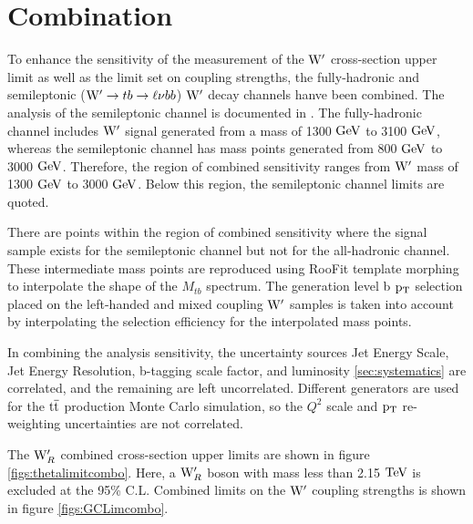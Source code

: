 \chapter{Combination}
\label{sec:combo}
To enhance the sensitivity of the measurement of the $\mathrm{W}^\prime$ cross-section upper limit as well as the limit set on coupling strengths, the fully-hadronic and 
semileptonic ($\mathrm{W}^\prime \to tb \to \ell\nu bb$) $\mathrm{W}^\prime$ decay channels hanve been combined.  
The analysis of the semileptonic channel is documented in \cite{Chatrchyan:2014koa}.  The fully-hadronic channel includes $\mathrm{W}^\prime$ signal generated from a 
mass of 1300 $\mathrm{GeV}$ to 3100 $\mathrm{GeV}$, whereas the semileptonic channel has mass points generated from 800 $\mathrm{GeV}$ to 3000 $\mathrm{GeV}$.  Therefore, the region of 
combined sensitivity ranges from $\mathrm{W}^\prime$ mass of 1300 $\mathrm{GeV}$ to 3000 $\mathrm{GeV}$.  Below this region, the semileptonic channel limits are quoted.  

There are points within the region of combined sensitivity where the signal sample exists for the semileptonic channel but not for the all-hadronic channel.  These 
intermediate mass points are reproduced using RooFit template morphing to interpolate the shape of the $M_{tb}$ spectrum.  
The generation level b $\mathrm{p_{T}}$ selection placed on the left-handed and mixed coupling $\mathrm{W}^\prime$ samples is taken into account by interpolating the 
selection efficiency for the interpolated mass points.

In combining the analysis sensitivity, the uncertainty sources Jet Energy Scale, 
Jet Energy Resolution, b-tagging scale factor, and luminosity \ref{sec:systematics} are correlated, and the remaining are left uncorrelated.  
Different generators are used for the $\mathrm{t\overline{t}}$ production Monte Carlo simulation, so the $Q^2$ scale and $\mathrm{p_{T}}$ re-weighting uncertainties are not correlated.

The $\mathrm{W}^\prime_{R}$ combined cross-section upper limits are shown in figure \ref{figs:thetalimitcombo}.  Here, a $\mathrm{W}^\prime_{R}$ boson with mass less than 2.15 $\mathrm{TeV}$ is excluded at the 95\% C.L.  
Combined limits on the $\mathrm{W}^\prime$ coupling strengths is shown in figure \ref{figs:GCLimcombo}.

